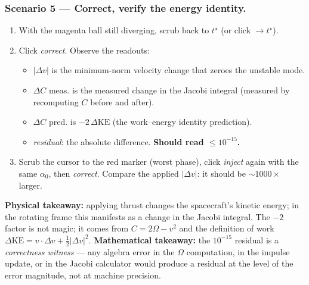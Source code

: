 \documentclass[11pt,a4paper]{article}
\begin{document}
\subsubsection*{Scenario 5 --- Correct, verify the energy identity.}
\begin{enumerate}[leftmargin=*]
  \item With the magenta ball still diverging, scrub back to $t^\star$ (or click $\to t^\star$).
  \item Click \emph{correct}. Observe the readouts:
    \begin{itemize}
      \item $|\Delta v|$ is the minimum-norm velocity change that zeroes the unstable mode.
      \item $\Delta C$ meas. is the measured change in the Jacobi integral (measured by recomputing $C$ before and after).
      \item $\Delta C$ pred. is $-2\,\Delta\mathrm{KE}$ (the work--energy identity prediction).
      \item \emph{residual}: the absolute difference. \textbf{Should read $\le 10^{-15}$.}
    \end{itemize}
  \item Scrub the cursor to the red marker (worst phase), click \emph{inject} again with the same $\alpha_0$, then \emph{correct}. Compare the applied $|\Delta v|$: it should be $\sim 1000\times$ larger.
\end{enumerate}
\textbf{Physical takeaway:} applying thrust changes the spacecraft's kinetic energy; in the rotating frame this manifests as a change in the Jacobi integral. The $-2$ factor is not magic; it comes from $C = 2\Omega - v^2$ and the definition of work $\Delta \mathrm{KE} = v\cdot \Delta v + \tfrac{1}{2}|\Delta v|^2$.
\textbf{Mathematical takeaway:} the $10^{-15}$ residual is a \emph{correctness witness} --- any algebra error in the $\Omega$ computation, in the impulse update, or in the Jacobi calculator would produce a residual at the level of the error magnitude, not at machine precision.
\end{document}
